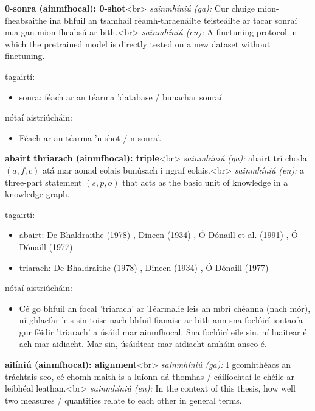 \documentclass{article}
\begin{document}
\textbf{0-sonra (ainmfhocal): 0-shot}<br>
\textit{sainmhíniú (ga):} Cur chuige mion-fheabsaithe ina bhfuil an tsamhail réamh-thraenáilte teisteáilte ar tacar sonraí nua gan mion-fheabsú ar bith.<br>
\textit{sainmhíniú (en):} A finetuning protocol in which the pretrained model is directly tested on a new dataset without finetuning.

tagairtí:
\begin{itemize}
	\item sonra: féach ar an téarma 'database / bunachar sonraí
\end{itemize}

nótaí aistriúcháin:
\begin{itemize}
	\item Féach ar an téarma 'n-shot / n-sonra'.
\end{itemize}


\textbf{abairt thriarach (ainmfhocal): triple}<br>
\textit{sainmhíniú (ga):} abairt trí choda $(a,f,c)$ atá mar aonad eolais bunúsach i ngraf eolais.<br>
\textit{sainmhíniú (en):} a three-part statement $(s,p,o)$ that acts as the basic unit of knowledge in a knowledge graph.

tagairtí:
\begin{itemize}
	\item abairt: De Bhaldraithe (1978) \cite{de-bhaldraithe}, Dineen (1934) \cite{dineen}, Ó Dónaill et al. (1991) \cite{focloir-beag}, Ó Dónaill (1977) \cite{odonaill}
	\item triarach: De Bhaldraithe (1978) \cite{de-bhaldraithe}, Dineen (1934) \cite{dineen}, Ó Dónaill (1977) \cite{odonaill}
\end{itemize}

nótaí aistriúcháin:
\begin{itemize}
	\item Cé go bhfuil an focal 'triarach' ar Téarma.ie leis an mbrí chéanna (nach mór), ní ghlacfar leis sin toisc nach bhfuil fianaise ar bith ann sna foclóirí iontaofa gur féidir 'triarach' a úsáid mar ainmfhocal. Sna foclóirí eile sin, ní luaitear é ach mar aidiacht. Mar sin, úsáidtear mar aidiacht amháin anseo é.
\end{itemize}


\textbf{ailíniú (ainmfhocal): alignment}<br>
\textit{sainmhíniú (ga):} I gcomhthéacs an tráchtais seo, cé chomh maith is a luíonn dá thomhas / cáilíochtaí le chéile ar leibhéal leathan.<br>
\textit{sainmhíniú (en):} In the context of this thesis, how well two measures / quantities relate to each other in general terms.
\end{document}

